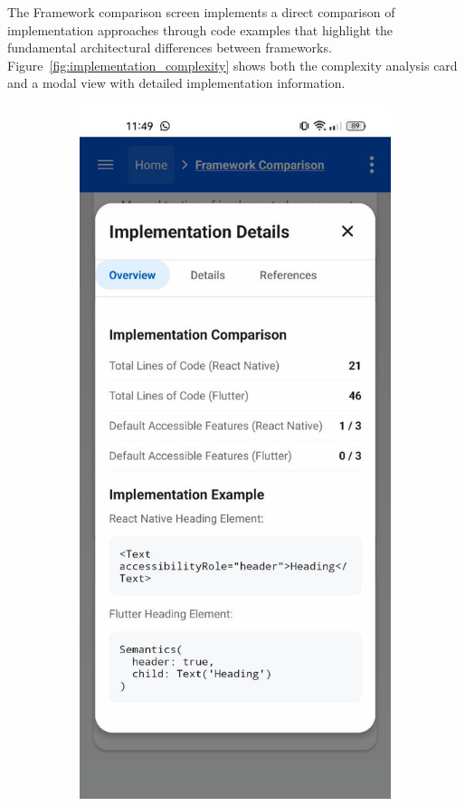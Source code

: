 {The Framework comparison screen implements a direct comparison of implementation approaches through code examples that highlight the fundamental architectural differences between frameworks. Figure~\ref{fig:implementation_complexity} shows both the complexity analysis card and a modal view with detailed implementation information.

\begin{figure}[ht]
    \centering
    \begin{subfigure}[b]{0.48\textwidth}
        \centering
        \includegraphics[width=\linewidth, alt={Implementation Complexity Analysis card}]{img/methodology-overview.jpg}

\end{subfigure}
\end{figure}}
